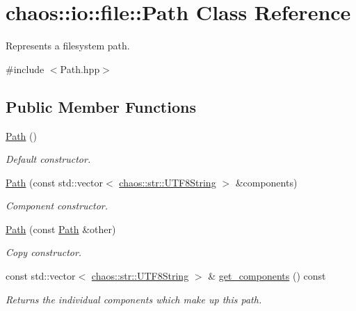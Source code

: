 \hypertarget{classchaos_1_1io_1_1file_1_1_path}{}\section{chaos\+:\+:io\+:\+:file\+:\+:Path Class Reference}
\label{classchaos_1_1io_1_1file_1_1_path}


Represents a filesystem path.  




{\ttfamily \#include $<$Path.\+hpp$>$}

\subsection*{Public Member Functions}
\begin{DoxyCompactItemize}
\item 
\hyperlink{classchaos_1_1io_1_1file_1_1_path_ae221e8dceeedda7ef0376e408a33b388}{Path} ()
\begin{DoxyCompactList}\small\item\em Default constructor. \end{DoxyCompactList}\item 
\hyperlink{classchaos_1_1io_1_1file_1_1_path_a2f99e6ecbc8012c704a7d59a82e44d7e}{Path} (const std\+::vector$<$ \hyperlink{classchaos_1_1str_1_1_u_t_f8_string}{chaos\+::str\+::\+U\+T\+F8\+String} $>$ \&components)
\begin{DoxyCompactList}\small\item\em Component constructor. \end{DoxyCompactList}\item 
\hyperlink{classchaos_1_1io_1_1file_1_1_path_a888031f678ac29c3c068c7c710057809}{Path} (const \hyperlink{classchaos_1_1io_1_1file_1_1_path}{Path} \&other)
\begin{DoxyCompactList}\small\item\em Copy constructor. \end{DoxyCompactList}\item 
const std\+::vector$<$ \hyperlink{classchaos_1_1str_1_1_u_t_f8_string}{chaos\+::str\+::\+U\+T\+F8\+String} $>$ \& \hyperlink{classchaos_1_1io_1_1file_1_1_path_a2cf2f806bd7e8969c6cd215271c0e104}{get\+\_\+components} () const 
\begin{DoxyCompactList}\small\item\em Returns the individual components which make up this path. \end{DoxyCompactList}\end{DoxyCompactItemize}


